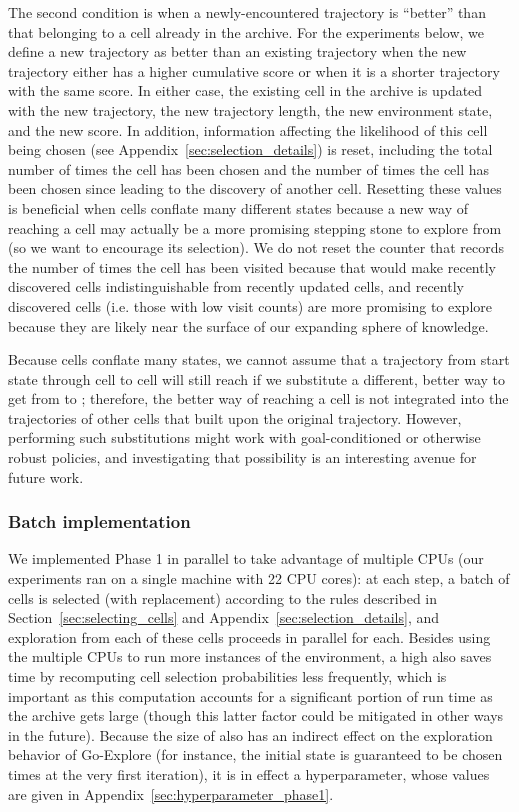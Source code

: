 \documentclass{article}
\begin{document}
The second condition is when a newly-encountered trajectory is ``better'' than that belonging to a cell already in the archive. For the experiments below, we define a new trajectory as better than an existing trajectory when the new trajectory either has a higher cumulative score or when it is a shorter trajectory with the same score. In either case, the existing cell in the archive is updated with the new trajectory, the new trajectory length, the new environment state, and the new score. In addition, information affecting the likelihood of this cell being chosen (see Appendix~\ref{sec:selection_details}) is reset, including the total number of times  the cell has been chosen and the number of times the cell has been chosen since leading to the discovery of another cell. Resetting these values is beneficial when cells conflate many different states because a new way of reaching a cell may actually be a more promising stepping stone to explore from (so we want to encourage its selection).
We do not reset the counter that records the number of times the cell has been visited because that would make recently discovered cells indistinguishable from recently updated cells, and recently discovered cells (i.e. those with low visit counts) are more promising to explore because they are likely near the surface of our expanding sphere of knowledge.

Because cells conflate many states, we cannot assume that a trajectory from start state  through cell  to cell  will still reach  if we substitute a different, better way to get from  to ; therefore, the better way of reaching a cell is not integrated into the trajectories of other cells that built upon the original trajectory. However, performing such substitutions might work with goal-conditioned or otherwise robust policies, and investigating that possibility is an interesting avenue for future work. 

\subsubsection{Batch implementation}

We implemented Phase 1 in parallel to take advantage of multiple CPUs (our experiments ran on a single machine with 22 CPU cores): at each step, a batch of  cells is selected (with replacement) according to the rules described in Section~\ref{sec:selecting_cells} and Appendix~\ref{sec:selection_details}, and exploration from each of these cells proceeds in parallel for each. Besides using the multiple CPUs to run more instances of the environment, a high  also saves time by recomputing cell selection probabilities less frequently, which is important as this computation accounts for a significant portion of run time as the archive gets large (though this latter factor could be mitigated in other ways in the future). Because the size of  also has an indirect effect on the exploration behavior of Go-Explore (for instance, the initial state is guaranteed to be chosen  times at the very first iteration), it is in effect a hyperparameter, whose values are given in Appendix~\ref{sec:hyperparameter_phase1}.
\end{document}
